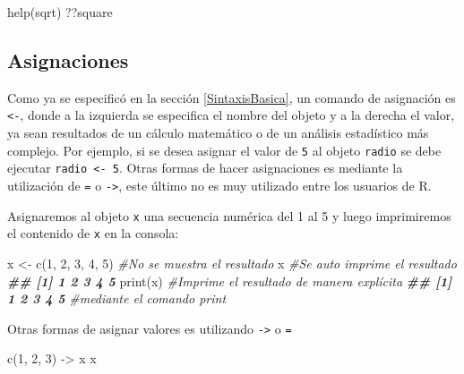 \documentclass[
]{book}
\newenvironment{Shaded}{\begin{snugshade}}{\end{snugshade}}
\newcommand{\CommentTok}[1]{\textcolor[rgb]{0.56,0.35,0.01}{\textit{#1}}}
\newcommand{\DecValTok}[1]{\textcolor[rgb]{0.00,0.00,0.81}{#1}}
\newcommand{\DocumentationTok}[1]{\textcolor[rgb]{0.56,0.35,0.01}{\textbf{\textit{#1}}}}
\newcommand{\FunctionTok}[1]{\textcolor[rgb]{0.00,0.00,0.00}{#1}}
\newcommand{\NormalTok}[1]{#1}
\newcommand{\OtherTok}[1]{\textcolor[rgb]{0.56,0.35,0.01}{#1}}
\begin{document}
\begin{Shaded}
\begin{Highlighting}[]
\FunctionTok{help}\NormalTok{(sqrt)}
\NormalTok{??square}
\end{Highlighting}
\end{Shaded}

\hypertarget{asignaciones}{%
\subsection{Asignaciones}\label{asignaciones}}

Como ya se especificó en la sección \ref{SintaxisBasica}, un comando de
asignación es \texttt{\textless{}-}, donde a la izquierda se especifica el nombre del objeto y a
la derecha el valor, ya sean resultados de un cálculo matemático o de un análisis
estadístico más complejo. Por ejemplo, si se desea asignar el valor de \texttt{5} al
objeto \texttt{radio} se debe ejecutar \texttt{radio\ \textless{}-\ 5}. Otras formas de hacer asignaciones
es mediante la utilización de \texttt{=} o \texttt{-\textgreater{}}, este último no es muy utilizado entre
los usuarios de R.

Asignaremos al objeto \texttt{x} una secuencia numérica del 1 al 5 y luego imprimiremos
el contenido de \texttt{x} en la consola:

\begin{Shaded}
\begin{Highlighting}[]
\NormalTok{x }\OtherTok{\textless{}{-}} \FunctionTok{c}\NormalTok{(}\DecValTok{1}\NormalTok{, }\DecValTok{2}\NormalTok{, }\DecValTok{3}\NormalTok{, }\DecValTok{4}\NormalTok{, }\DecValTok{5}\NormalTok{)  }\CommentTok{\#No se muestra el resultado}
\NormalTok{x                      }\CommentTok{\#Se auto imprime el resultado}
\DocumentationTok{\#\# [1] 1 2 3 4 5}
\FunctionTok{print}\NormalTok{(x)               }\CommentTok{\#Imprime el resultado de manera explícita }
\DocumentationTok{\#\# [1] 1 2 3 4 5}
                       \CommentTok{\#mediante el comando print }
\end{Highlighting}
\end{Shaded}

Otras formas de asignar valores es utilizando \texttt{-\textgreater{}} o \texttt{=}

\begin{Shaded}
\begin{Highlighting}[]
\FunctionTok{c}\NormalTok{(}\DecValTok{1}\NormalTok{, }\DecValTok{2}\NormalTok{, }\DecValTok{3}\NormalTok{) }\OtherTok{{-}\textgreater{}}\NormalTok{ x}
\NormalTok{x}
\end{Highlighting}
\end{Shaded}
\end{document}
